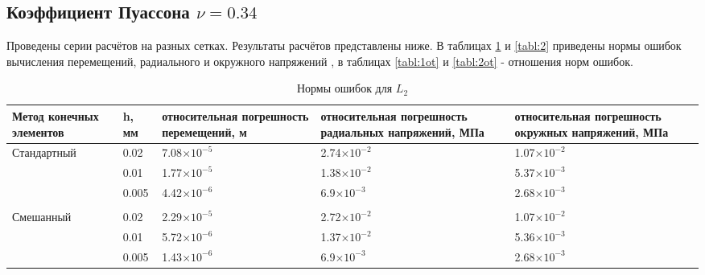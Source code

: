 \documentclass[a4paper,14pt]{extarticle}
\begin{document}
\newpage
\subsection{Коэффициент Пуассона $\nu=0.34$}

Проведены серии расчётов на разных сетках. Результаты расчётов представлены ниже. В таблицах \ref{tabl:1} и \ref{tabl:2} приведены нормы ошибок вычисления перемещений, радиального и окружного напряжений , в таблицах \ref{tabl:1ot} и \ref{tabl:2ot} - отношения норм ошибок.

\begin{spacing}{1.0}
\begin{table}[h]
\caption{Нормы ошибок для $L_{2}$}
\label{tabl:1}
\begin{center}
\begin{tabular}{|p{6em}|p{2.5em}|p{7em}|p{7em}|p{7em}|}
\hline
Метод \newline конечных элементов&h, мм & относительная погрешность перемещений, м & относительная погрешность радиальных напряжений, МПа &  относительная погрешность окружных напряжений, МПа \\ \hline
\multirow{3}{*}{Стандартный}
& 0.02 &7.08$\times 10^{-5}$& 2.74$\times 10^{-2}$& 1.07$\times 10^{-2}$ \\ \cline{2-5}
& 0.01 &1.77$\times 10^{-5}$& 1.38$\times 10^{-2}$& 5.37$\times 10^{-3}$ \\ \cline{2-5}
& 0.005&4.42$\times 10^{-6}$& 6.9$\times 10^{-3}$ & 2.68$\times 10^{-3}$ \\ \hline
\multicolumn{5}{|c|}{}\\
\hline
\multirow{3}{*}{Смешанный}
&0.02 &2.29$\times 10^{-5}$& 2.72$\times 10^{-2}$ & 1.07$\times 10^{-2}$ \\ \cline{2-5}
&0.01 &5.72$\times 10^{-6}$& 1.37$\times 10^{-2}$ & 5.36$\times 10^{-3}$ \\ \cline{2-5}
&0.005&1.43$\times 10^{-6}$& 6.9$\times 10^{-3}$  & 2.68$\times 10^{-3}$ \\ \hline
\end{tabular}
\end{center}
\end{table}


\end{spacing}
\end{document}
